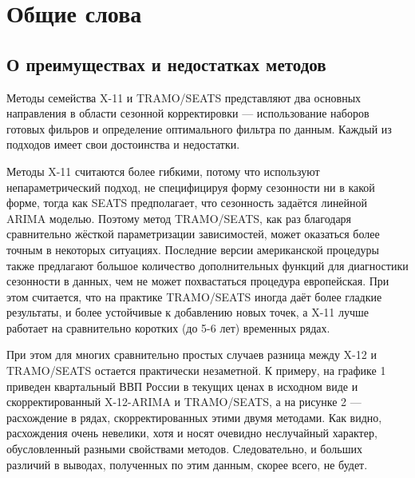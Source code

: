 \documentclass[final,pdftex]{../../template/epsilonj}\usepackage[]{graphicx}\usepackage[]{color}
\begin{document}
\section{Общие слова}
\subsection{О преимуществах и недостатках методов}

Методы семейства X-11 и TRAMO/SEATS представляют два основных направления в области сезонной корректировки --- использование наборов готовых фильров и определение оптимального фильтра по данным. Каждый из подходов имеет свои достоинства и недостатки. 

Методы X-11 считаются более гибкими, потому что используют непараметрический подход, не специфицируя форму сезонности ни в какой форме, тогда как SEATS предполагает, что сезонность задаётся линейной ARIMA моделью. Поэтому метод TRAMO/SEATS, как раз благодаря сравнительно жёсткой параметризации зависимостей, может оказаться более точным в некоторых ситуациях. Последние версии американской процедуры также предлагают большое количество дополнительных функций для диагностики сезонности в данных, чем не может похвастаться процедура европейская. При этом считается, что на практике TRAMO/SEATS иногда даёт более гладкие результаты, и более устойчивые к добавлению новых точек, а X-11 лучше работает на сравнительно коротких (до 5-6 лет) временных рядах. 

При этом для многих сравнительно простых случаев разница между X-12 и TRAMO/SEATS остается практически незаметной. К примеру, на графике 1 приведен квартальный ВВП России в текущих ценах в исходном виде и скорректированный X-12-ARIMA и TRAMO/SEATS, а на рисунке 2 --- расхождение в рядах, скорректированных этими двумя методами. Как видно, расхождения очень невелики, хотя и носят очевидно неслучайный характер, обусловленный разными свойствами методов. Следовательно, и больших различий в выводах, полученных по этим данным, скорее всего, не будет. 
\end{document}
